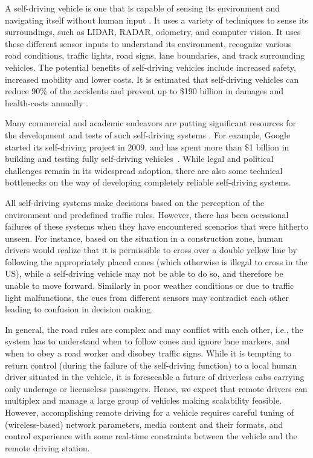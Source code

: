 
A self-driving vehicle is one that is capable of sensing 
its environment and navigating itself without human input \cite{wikiselfdrivingcar}. 
It uses a variety of techniques to sense its surroundings,
such as LIDAR, RADAR, odometry, and computer vision. 
It uses these different sensor inputs 
to understand its environment, 
recognize various road conditions, traffic lights, road signs,
lane boundaries, and track surrounding vehicles.
The potential benefits of self-driving vehicles
include increased safety, increased mobility and lower
costs. 
It is estimated that self-driving vehicles can reduce 90\%
of the accidents and prevent up to \$190 
billion in damages and health-costs annually
\cite{litman2014autonomous}.


Many commercial and academic endeavors are putting significant resources
for the development and tests
of such self-driving systems \cite{waymo, benz, autox}.
For example, Google started its self-driving project in 2009,  
and has spent more than \$1 billion
in building and testing fully self-driving vehicles~\cite{googlespend}. 
While legal and political challenges remain in its widespread adoption,
there are also some technical bottlenecks on the way of developing
completely reliable self-driving systems.


All self-driving systems make
decisions based on the perception of the environment and
predefined traffic rules. However, there has been occasional
failures of these systems when they have encountered scenarios
that were hitherto unseen. For instance, based on the situation
 in a construction
zone, human drivers would realize that it is permissible to cross
over a double yellow line by following the appropriately placed
cones  (which otherwise is illegal to cross
in the US), while a self-driving vehicle may not be able to
do so, and therefore be unable to move forward. Similarly in
poor weather conditions or due to traffic light malfunctions,  
the cues from different sensors may
contradict each other leading to confusion in decision making.

In general, the road rules are complex and may conflict with
each other, i.e., the system has to understand when
to follow cones and ignore lane markers, 
and when to obey a road worker and disobey traffic
signs.
While it is tempting to return control (during the failure of the self-driving
function) to a local human driver situated in the vehicle, 
it is foreseeable a future of driverless cabs carrying only
underage or licenseless passengers.
Hence, we expect that remote drivers can multiplex and manage
a large group of vehicles making scalability feasible.
However, accomplishing remote driving for a vehicle requires careful tuning 
of (wireless-based) network parameters, media content and their formats,
and control experience with some real-time constraints between the vehicle 
and the remote driving station.



